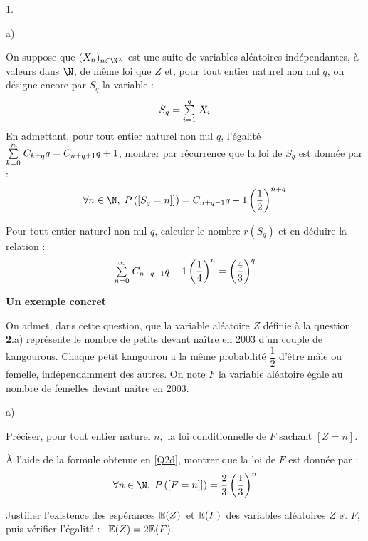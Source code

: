 \documentclass[11pt]{article}%
\begin{document}
\begin{noliste}{1.}
\begin{noliste}{a)}
\item On suppose que $(X_{n})_{n\in \N^{\times }}$ est une suite de
variables aléatoires indépendantes, à valeurs dans $\N$, de même loi
que $Z$ et, pour tout entier naturel non nul $q$, on désigne encore par
$S_{q}$ la variable : 
\[
S_{q} = {\textstyle\sum\limits_{i = 1}^{q}}\hspace{.1cm}X_{i}
\]
En admettant, pour tout entier naturel non nul $q$, l'égalité \ ${\textstyle\sum\limits_{k
= 0}^{n}}\hspace{.1cm}C_{k + q}{q} = C_{n + q + 1}{q + 1}$, montrer par récurrence
que la loi de $S_{q}$ est donnée par : 
\[
\forall n\in \N,\;P\left(\Ev{S_{q} = n]}\right) = C_{n +
q-1}{q-1}\left( \dfrac{1}{2}\right) ^{n + q}
\]

\item \label{Q2d} Pour tout entier naturel non nul $q$, calculer le
nombre $r(S_{q})$ et en déduire la relation : 
\[
{\textstyle\sum\limits_{n = 0}^{\infty }}\hspace{.1cm}C_{n + q-1}{q-1}\left( \dfrac{1}{4}\right) ^{n} =
\left( 
\dfrac{4}{3}\right) ^{q}
\]
\end{noliste}

\item \textbf{Un exemple concret }

On admet, dans cette question, que la variable aléatoire $Z$ définie à
la
question \textbf{2}.a) représente le nombre de petits devant naître en
2003
d'un couple de kangourous. Chaque petit kangourou a la même probabilité
$\dfrac{1}{2}$ d'être mâle ou femelle, indépendamment des autres. On
note $F$
la variable aléatoire égale au nombre de femelles devant naître en
$2003$.

\begin{noliste}{a)}
 \setlength{\itemsep}{2mm}
\item Préciser, pour tout entier naturel $n,$ la loi conditionnelle de
$F$
sachant $[Z = n]$.

\item À l'aide de la formule obtenue en \ref{Q2d}, montrer que la loi
de $F$
est donnée par : 
\[
\forall n\in \N,\;P\left(\Ev{F = n]}\right) = \dfrac{2}{3}\left(
\dfrac{1}{3}\right)
^{n}
\]

\item Justifier l'existence des espérances $\mathbb{E}(Z)$\ et $\mathbb{E}(F)$\ des
variables
aléatoires $Z$ et $F$, puis vérifier l'égalité : \ $\mathbb{E}(Z) = 2\mathbb{E}(F).$\ 
\end{noliste}
\end{noliste}

\label{fin}
\end{document}
